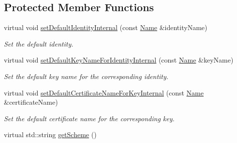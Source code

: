 \subsection*{Protected Member Functions}
\begin{DoxyCompactItemize}
\item 
virtual void \hyperlink{classndn_1_1security_1_1DummyPublicInfo_aa14333bd971273ba2040dca58d815113}{set\+Default\+Identity\+Internal} (const \hyperlink{classndn_1_1Name}{Name} \&identity\+Name)
\begin{DoxyCompactList}\small\item\em Set the default identity. \end{DoxyCompactList}\item 
virtual void \hyperlink{classndn_1_1security_1_1DummyPublicInfo_a7aa7e17d2abb04daa7e86edebbdd9af8}{set\+Default\+Key\+Name\+For\+Identity\+Internal} (const \hyperlink{classndn_1_1Name}{Name} \&key\+Name)
\begin{DoxyCompactList}\small\item\em Set the default key name for the corresponding identity. \end{DoxyCompactList}\item 
virtual void \hyperlink{classndn_1_1security_1_1DummyPublicInfo_a4a93a0487f53b90e3323c1312300213a}{set\+Default\+Certificate\+Name\+For\+Key\+Internal} (const \hyperlink{classndn_1_1Name}{Name} \&certificate\+Name)
\begin{DoxyCompactList}\small\item\em Set the default certificate name for the corresponding key. \end{DoxyCompactList}\item 
virtual std\+::string \hyperlink{classndn_1_1security_1_1DummyPublicInfo_a5f8c2c729c32b569f2e92bcfb0b2cd29}{get\+Scheme} ()\hypertarget{classndn_1_1security_1_1DummyPublicInfo_a5f8c2c729c32b569f2e92bcfb0b2cd29}{}\label{classndn_1_1security_1_1DummyPublicInfo_a5f8c2c729c32b569f2e92bcfb0b2cd29}


\end{DoxyCompactItemize}
